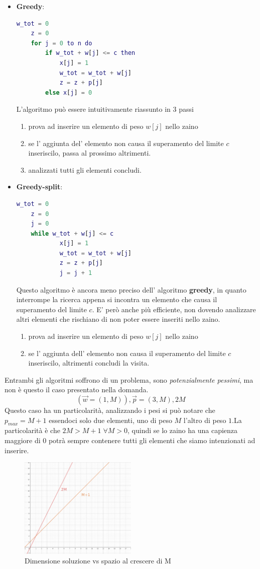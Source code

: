 \documentclass[a4paper]{article}
\begin{document}
\begin{itemize}
	\item \textbf{Greedy}: 
		\begin{lstlisting}[language=Matlab]
	w_tot = 0
	z = 0
	for j = 0 to n do
		if w_tot + w[j] <= c then
			x[j] = 1
			w_tot = w_tot + w[j]
			z = z + p[j]
		else x[j] = 0
		\end{lstlisting}
		L'algoritmo può essere intuitivamente riassunto in 3 passi
		\begin{enumerate}
			\item prova ad inserire un elemento di peso $w[j]$ nello zaino
			\item se l' aggiunta del' elemento non causa il superamento del limite $c$ inseriscilo, passa al prossimo altrimenti.
			\item analizzati tutti gli elementi concludi.
		\end{enumerate}
	\item \textbf{Greedy-split}:
		\begin{lstlisting}[language=Matlab]
	w_tot = 0
	z = 0
	j = 0
	while w_tot + w[j] <= c
			x[j] = 1
			w_tot = w_tot + w[j]
			z = z + p[j]
			j = j + 1
		\end{lstlisting}
		Questo algoritmo è ancora meno preciso dell' algoritmo \textbf{greedy}, in quanto interrompe la ricerca appena si incontra un elemento che causa il superamento del limite $c$.
		E' però anche più efficiente, non dovendo analizzare altri elementi che rischiano di non poter essere inseriti nello zaino.
		\begin{enumerate}
			\item prova ad inserire un elemento di peso $w[j]$ nello zaino
			\item se l' aggiunta dell' elemento non causa il superamento del limite $c$ inseriscilo, altrimenti concludi la visita.
		\end{enumerate}
\end{itemize}
Entrambi gli algoritmi soffrono di un problema, sono \textit{potenzialmente pessimi}, ma non è questo il caso presentato nella domanda.
$$(\vec w = (1,M)), \vec p = (3,M), 2M$$
Questo caso ha un particolarità, analizzando i pesi si può notare che $p_{max} = M +1$ essendoci solo due elementi, uno di peso $M$ l'altro di peso $1$.La particolarità è che $2M > M + 1 \; \forall M > 0$, quindi se lo zaino ha una capienza maggiore di $0$ potrà sempre contenere tutti gli elementi che siamo intenzionati ad inserire.
\begin{figure}[!ht]
\centering
\includegraphics[width=0.5\textwidth]{./img/C_8.png}
\caption{Dimensione soluzione vs spazio al crescere di M} \label{FIG:C_8}
\end{figure}\\
\end{document}
